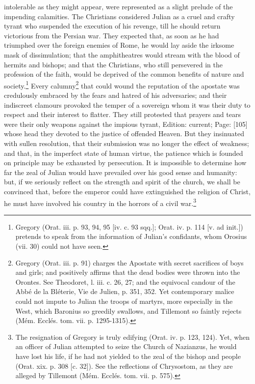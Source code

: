 intolerable as they might appear, were represented as a slight prelude of the impending calamities. The Christians considered Julian as a cruel and crafty tyrant who suspended the execution of his revenge, till he should return victorious from the Persian war. They expected that, as soon as he had triumphed over the foreign enemies of Rome, he would lay aside the irksome mask of dissimulation; that the amphitheatres would stream with the blood of hermits and bishops; and that the Christians, who still persevered in the profession of the faith, would be deprived of the common benefits of nature and society.\footnote{Gregory (Orat. iii. p. 93, 94, 95 [iv. c. 93 sqq.]; Orat. iv. p. 114 [v. ad init.]) pretends to speak from the information of Julian\texthebrew{}’s confidants, whom Orosius (vii. 30) could not have seen.} Every calumny\footnote{Gregory (Orat. iii. p. 91) charges the Apostate with secret sacrifices of boys and girls; and positively affirms that the dead bodies were thrown into the Orontes. See Theodoret, l. iii. c. 26, 27; and the equivocal candour of the Abbé de la Bléterie, Vie de Julien, p. 351, 352. Yet contemporary malice could not impute to Julian the troops of martyrs, more especially in the West, which Baronius so greedily swallows, and Tillemont so faintly rejects (Mém. Ecclés. tom. vii. p. 1295-1315).} that could wound the reputation of the apostate was credulously embraced by the fears and hatred of his adversaries; and their indiscreet clamours provoked the temper of a sovereign whom it was their duty to respect and their interest to flatter. They still protested that prayers and tears were their only weapons against the impious tyrant, Edition: current; Page: [105] whose head they devoted to the justice of offended Heaven. But they insinuated with sullen resolution, that their submission was no longer the effect of weakness; and that, in the imperfect state of human virtue, the patience which is founded on principle may be exhausted by persecution. It is impossible to determine how far the zeal of Julian would have prevailed over his good sense and humanity: but, if we seriously reflect on the strength and spirit of the church, we shall be convinced that, before the emperor could have extinguished the religion of Christ, he must have involved his country in the horrors of a civil war.\footnote{The resignation of Gregory is truly edifying (Orat. iv. p. 123, 124). Yet, when an officer of Julian attempted to seize the Church of Nazianzus, he would have lost his life, if he had not yielded to the zeal of the bishop and people (Orat. xix. p. 308 [c. 32]). See the reflections of Chrysostom, as they are alleged by Tillemont (Mém. Ecclés. tom. vii. p. 575).}


